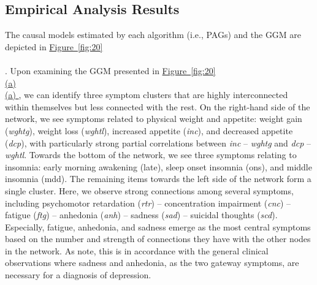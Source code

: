 \documentclass[twoside, 11pt]{article}
\newcommand*{\figref}[2][]{%
  \hyperref[{fig:#2}]{%
    Figure~\ref*{fig:#2}%
    \ifx\\#1\\%
    \else
      #1%
    \fi
  }%
}
\begin{document}





\subsection{Empirical Analysis Results} \label{empiricalresult}
The causal models estimated by each algorithm (i.e., PAGs) and the GGM are depicted in \figref[]{20}. Upon examining the GGM presented in \figref[(a)]{20}, we can identify three symptom clusters that are highly interconnected within themselves but less connected with the rest. On the right-hand side of the network, we see symptoms related to physical weight and appetite: weight gain (\textit{wghtg}), weight loss (\textit{wghtl}), increased appetite (\textit{inc}), and decreased appetite (\textit{dcp}), with particularly strong partial correlations between \textit{inc} -- \textit{wghtg} and \textit{dcp} -- \textit{wghtl}. Towards the bottom of the network, we see three symptoms relating to insomnia: early morning awakening (late), sleep onset insomnia (ons), and middle insomnia (mdd). The remaining items towards the left side of the network form a single cluster. Here, we observe strong connections among several symptoms, including psychomotor retardation (\textit{rtr}) -- concentration impairment (\textit{cnc}) -- fatigue (\textit{ftg}) -- anhedonia (\textit{anh}) -- sadness (\textit{sad}) -- suicidal thoughts (\textit{scd}). Especially, fatigue, anhedonia, and sadness emerge as the most central symptoms based on the number and strength of connections they have with the other nodes in the network. As \cite{mcnally_co-morbid_2017} note, this is in accordance with the general clinical observations where sadness and anhedonia, as the two gateway symptoms, are necessary for a diagnosis of depression. 
\end{document}

